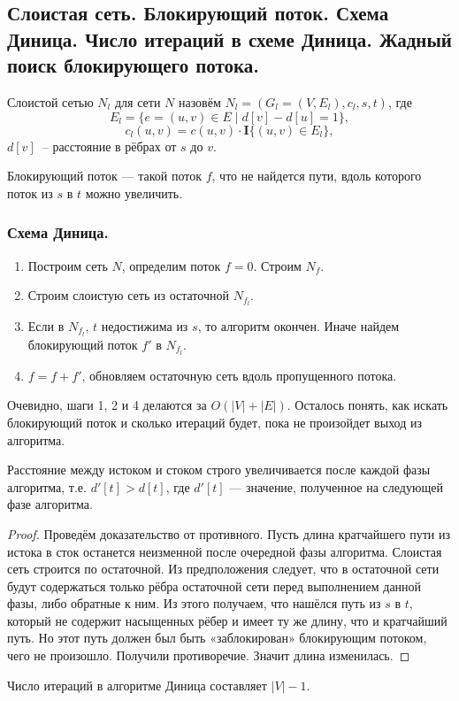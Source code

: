\documentclass[a4paper,14pt]{article}
\begin{document}
    \subsection{Слоистая сеть. Блокирующий поток. Схема Диница. Число итераций в схеме Диница. Жадный
    поиск блокирующего потока.}
    \label{subsec:dinic}
    \begin{Def}
        Слоистой сетью $N_l$ для сети $N$ назовём $N_l = (G_l = (V, E_l), c_l, s, t)$, где
        \[
        E_l = \{e = (u, v) \in E \mid d[v] - d[u] = 1\},
        \]
        \[
        c_l(u, v) = c(u, v) \cdot \mathbf{I}\{(u, v) \in E_l\},
        \]
        $d[v]$~-- расстояние в рёбрах от $s$ до $v$.

    \end{Def}
    \begin{Def}
        Блокирующий поток — такой поток $f$, что не найдется пути, вдоль
которого поток из $s$ в $t$ можно увеличить.
    \end{Def}
    \subsubsection*{Схема Диница.}
    \begin{enumerate}
        \item Построим сеть $N$, определим поток $f=0$. Строим $N_f$.
        \item Строим слоистую сеть из остаточной $N_{f_l}$.
        \item Если в $N_{f_l}$, $t$ недостижима из $s$, то алгоритм окончен. Иначе найдем блокирующий поток $f'$ в $N_{f_l}$.
        \item $f=f+f'$, обновляем остаточную сеть вдоль пропущенного потока. 
    \end{enumerate}
    Очевидно, шаги 1, 2 и 4 делаются за $O(|V|+|E|)$. Осталось понять,
как искать блокирующий поток и сколько итераций будет, пока не
произойдет выход из алгоритма.
    \begin{prop}
        Расстояние между истоком и стоком строго увеличивается после
каждой фазы алгоритма, т.е. $d'[t]>d[t]$, где $d'[t]$ — значение,
полученное на следующей фазе алгоритма.
    \end{prop}
    \begin{proof}
        Проведём доказательство от противного. Пусть длина кратчайшего
пути из истока в сток останется неизменной после очередной фазы
алгоритма. Слоистая сеть строится по остаточной. Из
предположения следует, что в остаточной сети будут содержаться
только рёбра остаточной сети перед выполнением данной фазы,
либо обратные к ним. Из этого получаем, что нашёлся путь из $s$ в $t$,
который не содержит насыщенных рёбер и имеет ту же длину, что
и кратчайший путь. Но этот путь должен был быть
«заблокирован» блокирующим потоком, чего не произошло.
Получили противоречие. Значит длина изменилась.
    \end{proof}
    \begin{corollary}
        Число итераций в алгоритме Диница составляет $|V|-1$.
    \end{corollary}
\end{document}
